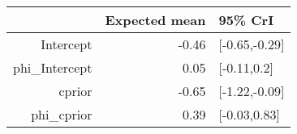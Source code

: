 \begin{tabular}{rrl}
  \hline
 & Expected mean & 95\% CrI \\ 
  \hline
Intercept & -0.46 & [-0.65,-0.29] \\ 
  phi\_Intercept & 0.05 & [-0.11,0.2] \\ 
  cprior & -0.65 & [-1.22,-0.09] \\ 
  phi\_cprior & 0.39 & [-0.03,0.83] \\ 
   \hline
\end{tabular}

